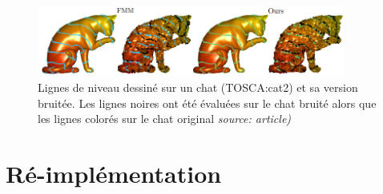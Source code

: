 \documentclass[11pt]{article} %
\begin{document}
\begin{figure}[h]
\centering
\includegraphics[width=0.9\textwidth]{imgs/noise}
\caption{Lignes de niveau dessiné sur un chat (TOSCA:cat2) et sa version bruitée. Les lignes noires ont été évaluées sur le chat bruité alors que les lignes colorés sur le chat original \textit{source: article)}}
\label{noise}
\end{figure}

\section{Ré-implémentation}
\end{document}
